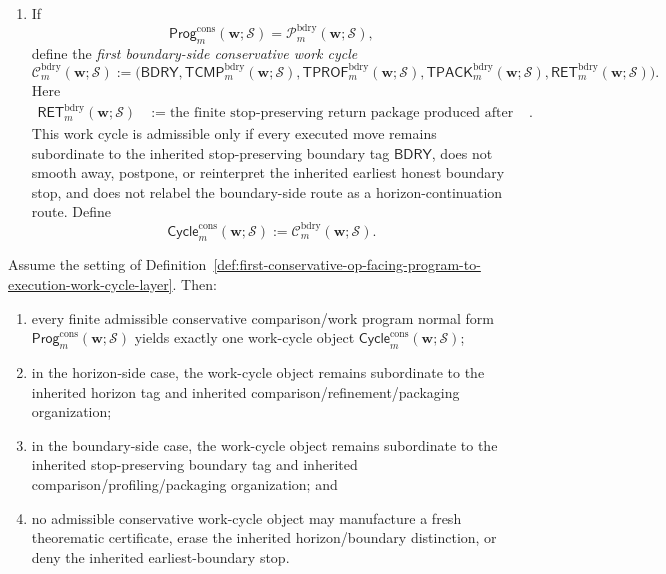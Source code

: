 \begin{definition}
\begin{enumerate}[label=(\roman*)]
  \item If
  \[
    \mathsf{Prog}^{\mathrm{cons}}_{m}(\mathbf w;\mathcal S)
    =
    \mathcal P^{\mathrm{bdry}}_{m}(\mathbf w;\mathcal S),
  \]
define the \emph{first boundary-side conservative work cycle}
\[
  \mathcal C^{\mathrm{bdry}}_{m}(\mathbf w;\mathcal S)
  :=
  \bigl(
    \mathsf{BDRY},
    \mathsf{TCMP}^{\mathrm{bdry}}_{m}(\mathbf w;\mathcal S),
    \mathsf{TPROF}^{\mathrm{bdry}}_{m}(\mathbf w;\mathcal S),
    \mathsf{TPACK}^{\mathrm{bdry}}_{m}(\mathbf w;\mathcal S),
    \mathsf{RET}^{\mathrm{bdry}}_{m}(\mathbf w;\mathcal S)
  \bigr).
\]
Here
\begin{align*}
  \mathsf{RET}^{\mathrm{bdry}}_{m}(\mathbf w;\mathcal S)
  &:= \text{the finite stop-preserving return package produced after executing the admitted boundary-side comparison/profiling/packaging cycle}.
\end{align*}
This work cycle is admissible only if every executed move remains subordinate to the inherited stop-preserving boundary tag \(\mathsf{BDRY}\), does not smooth away, postpone, or reinterpret the inherited earliest honest boundary stop, and does not relabel the boundary-side route as a horizon-continuation route. Define
\[
  \mathsf{Cycle}^{\mathrm{cons}}_{m}(\mathbf w;\mathcal S)
  :=
  \mathcal C^{\mathrm{bdry}}_{m}(\mathbf w;\mathcal S).
\]
\end{enumerate}
\end{definition}

\begin{proposition}
\label{prop:every-finite-admissible-conservative-comparison-work-program-normal-form-yields-exactly-one-conservative-work-cycle-object}
Assume the setting of Definition~\ref{def:first-conservative-op-facing-program-to-execution-work-cycle-layer}. Then:
\begin{enumerate}[label=(\roman*)]
  \item every finite admissible conservative comparison/work program normal form \(\mathsf{Prog}^{\mathrm{cons}}_{m}(\mathbf w;\mathcal S)\) yields exactly one work-cycle object \(\mathsf{Cycle}^{\mathrm{cons}}_{m}(\mathbf w;\mathcal S)\);
  \item in the horizon-side case, the work-cycle object remains subordinate to the inherited horizon tag and inherited comparison/refinement/packaging organization;
  \item in the boundary-side case, the work-cycle object remains subordinate to the inherited stop-preserving boundary tag and inherited comparison/profiling/packaging organization; and
  \item no admissible conservative work-cycle object may manufacture a fresh theorematic certificate, erase the inherited horizon/boundary distinction, or deny the inherited earliest-boundary stop.
\end{enumerate}
\end{proposition}


